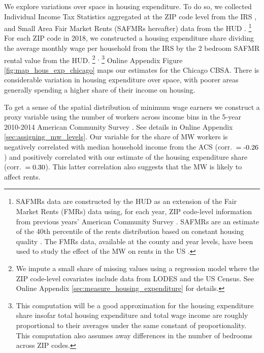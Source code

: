 
We explore variations over space in housing expenditure.
To do so, we collected Individual Income Tax Statistics aggregated at the 
ZIP code level from the IRS \parencite{IRS},
and Small Area Fair Market Rents (SAFMRs hereafter) data from the HUD 
\parencite{hudSAFMR}.%
\footnote{SAFMRs data are constructed by the HUD as an extension of the
    Fair Market Rents (FMRs) data using, for each year, ZIP code-level information
    from previous years' American Community Survey 
    \parencite[][, p.\ 35]{SafmrReport2018}.
    SAFMRs are an estimate of the 40th percentile of the rents distribution
    based on constant housing quality \parencite[][, p.\ 1]{SafmrReport2018}.
    The FMRs data, available at the county and year levels, have been used to study 
    the effect of the MW on rents in the US \parencite{Tidemann2018, Yamagishi2019}.}
For each ZIP code in 2018, we constructed a housing expenditure share dividing 
the average monthly wage per household from the IRS by the 2 bedroom SAFMR 
rental value from the HUD.%
\footnote{We impute a small share of missing values using a regression model 
	where the ZIP code-level covariates include data from LODES and the US 
	Census.
	See Online Appendix \ref{sec:measure_housing_expenditure} for details.}%
\textsuperscript{,}%
\footnote{This computation will be a good approximation for the housing 
	expenditure share insofar total housing expenditure and total wage income 
	are roughly proportional to their averages under the same constant of 
	proportionality.
	This computation also assumes away differences in the number of bedrooms 
	across ZIP codes.}
Online Appendix Figure \ref{fig:map_hous_exp_chicago} maps our estimates for the 
Chicago CBSA.
There is considerable variation in housing expenditure over space, with poorer
areas generally spending a higher share of their income on housing.

To get a sense of the spatial distribution of minimum wage earners we construct 
a proxy variable using the number of workers across income bins in the 5-year 
2010-2014 American Community Survey \parencite[ACS;][]{CensusACS}.
See details in Online Appendix \ref{sec:assigning_mw_levels}.
Our variable for the share of MW workers is negatively correlated with median 
household income from the ACS (corr.\ $=\textnormal{-0.26}$) and 
positively correlated with our estimate of the housing expenditure share 
(corr.\ $=\textnormal{0.30}$).
This latter correlation also suggests that the MW is likely to affect rents.

